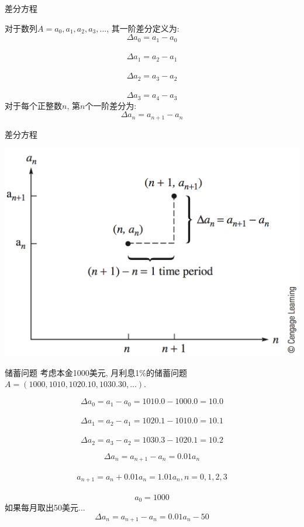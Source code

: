 \documentclass[UTF8]{ctexbeamer}
\begin{document}
\begin{frame}{差分方程}

  \begin{definition}
    对于数列$A = {a_0, a_1, a_2, a_3, ...}$, 其一阶差分定义为:
    \[
    \Delta a_0 = a_1 - a_0
    \]\\[-20pt]
    \[
    \Delta a_1 = a_2 - a_1
    \]\\[-20pt]
    \[
    \Delta a_2 = a_3 - a_2
    \]\\[-20pt]
    \[
    \Delta a_3 = a_4 - a_3
    \]
    对于每个正整数$n$, 第$n$个一阶差分为:
    \[
    \Delta a_n = a_{n+1} - a_n
    \]
  \end{definition}
\end{frame}

\begin{frame}{差分方程}
  \begin{center}
    \includegraphics[width=.8\textwidth{}]{difference.png}
  \end{center}
\end{frame}

\begin{frame}{储蓄问题}
考虑本金1000美元, 月利息1\%的储蓄问题$A = (1000, 1010, 1020.10, 1030.30, ...)$.
\begin{block}{}
    \[
    \Delta a_0 = a_1 - a_0 = 1010.0 - 1000.0 = 10.0
    \]\\[-20pt]
    \[
    \Delta a_1 = a_2 - a_1 = 1020.1 - 1010.0 = 10.1
    \]\\[-20pt]
    \[
    \Delta a_2 = a_3 - a_2 = 1030.3 - 1020.1 = 10.2
    \]
\end{block}

\[
\Delta a_n = a_{n+1} - a_n = 0.01a_n
\]\\[-25pt]
\[
a_{n+1} = a_n + 0.01a_n = 1.01a_n, n = 0, 1, 2, 3
\]\\[-25pt]
\[
a_0 = 1000
\]
  如果每月取出50美元...
\[
\Delta a_n = a_{n+1} - a_n = 0.01a_n - 50
\]

\end{frame}
\end{document}
